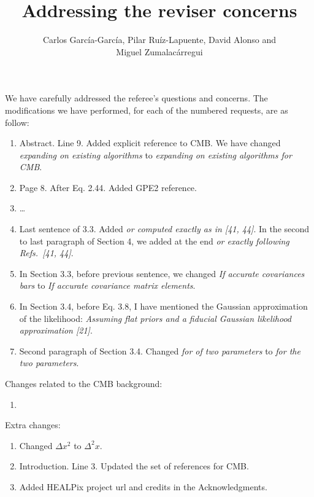\documentclass[a4paper]{article}
\title{Addressing the reviser concerns}
\author{Carlos Garc\'ia-Garc\'ia, Pilar Ru\'iz-Lapuente, David Alonso and\\ Miguel
  Zumalac\'arregui}
\newcommand{\cgg}[1]{\textcolor{midgreen}{#1}}
\begin{document}
\maketitle
We have carefully addressed the referee's questions and concerns. The
modifications we have performed, for each of the numbered requests, are as
follow:
\begin{enumerate}
  \item  Abstract. Line 9. Added explicit reference to CMB. We have changed
    \textit{expanding on existing algorithms} to \textit{expanding on existing algorithms \cgg{for CMB}}.
  \item  Page 8. After Eq. 2.44. Added GPE2 reference.
  \item  \dots
  \item  Last sentence of 3.3. Added \textit{or computed exactly as in [41,
      44]}. In the second to last paragraph of Section 4, we added at the end
    \textit{or exactly following Refs.~[41, 44]}.
  \item  In Section 3.3, before previous sentence, we changed \textit{If accurate
    covariances bars} to \textit{If accurate covariance matrix \cgg{elements}}.
\item  In Section 3.4, before Eq. 3.8, I have mentioned the Gaussian
  approximation of the likelihood: \textit{Assuming flat priors \cgg{and a
      fiducial Gaussian likelihood approximation [21]}}.
  \item  Second paragraph of Section 3.4. Changed \textit{for of two
      parameters} to \textit{for the \cgg{two} parameters}.
\end{enumerate}

Changes related to the CMB background:
\begin{enumerate}
  \item  
\end{enumerate}

Extra changes:
\begin{enumerate}
  \item  Changed $\Delta x^2$ to $\Delta^2 x$.
  \item  Introduction. Line 3. Updated the set of references for CMB.
  \item  Added HEALPix project url and credits in the Acknowledgments.
\end{enumerate}
\end{document}
